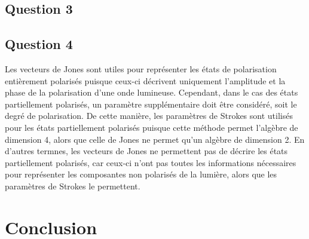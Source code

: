 \documentclass[11pt,letterpaper]{article}
\begin{document}
\subsection{Question 3}

\subsection{Question 4}
Les vecteurs de Jones sont utiles pour représenter les états de polarisation entièrement polarisés puisque ceux-ci décrivent uniquement l'amplitude et la phase de la polarisation d'une onde lumineuse. Cependant, dans le cas des états partiellement polarisés, un paramètre supplémentaire doit être considéré, soit le degré de polarisation. De cette manière, les paramètres de Strokes sont utilisés pour les états partiellement polarisés puisque cette méthode permet l'algèbre de dimension 4, alors que celle de Jones ne permet qu'un algèbre de dimension 2. En d'autres termnes, les vecteurs de Jones ne permettent pas de décrire les états partiellement polarisés, car ceux-ci n'ont pas toutes les informations nécessaires pour représenter les composantes non polarisés de la lumière, alors que les paramètres de Strokes le permettent.

\section{Conclusion}



\clearpage

% 
% 
\end{document}
